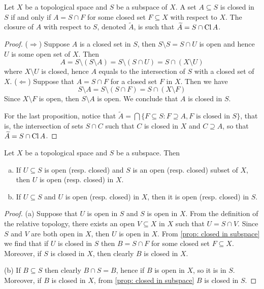 \begin{proposition}\label{prop: closed in subspace}
Let \(X\) be a topological space and \(S\) be a subspace of \(X\). A set
\(A \subseteq S\) is closed in \(S\) if and only if \(A = S \cap F\) for some
closed set \(F \subseteq X\) with respect to \(X\). The closure of \(A\) with
respect to \(S\), denoted \(\widetilde A\), is such that
\(\widetilde A = S \cap \operatorname{Cl} A\).
\end{proposition}

\begin{proof}
(\(\Rightarrow\)) Suppose \(A\) is a closed set in \(S\), then \(S \setminus
S = S \cap U\) is open and hence \(U\) is some open set of \(X\). Then
\[
  A = S \setminus (S \setminus A) = S \setminus (S \cap U)
  = S \cap (X \setminus U)
\]
where \(X \setminus U\) is closed, hence \(A\) equals to the intersection of
\(S\) with a closed set of \(X\).
(\(\Leftarrow\)) Suppose that \(A = S \cap F\) for a closed set \(F\) in
\(X\). Then we have
\[
  S \setminus A = S \setminus (S \cap F) = S \cap (X \setminus F)
\]
Since \(X\setminus F\) is open, then \(S \setminus A\) is open. We conclude
that \(A\) is closed in \(S\).

For the last proposition, notice that \(\widetilde A = \bigcap \{F \subseteq S
\colon F \supseteq A, F \text{ is closed in } S\}\), that is, the intersection of
sets \(S \cap C\) such that \(C\) is closed in \(X\) and \(C \supseteq A\), so
that \(\widetilde A = S \cap \operatorname{Cl} A\).
\end{proof}

\begin{proposition}\label{prop: relative open to open}
Let \(X\) be a topological space and \(S\) be a subspace. Then
\begin{enumerate}[(a)]\setlength\itemsep{0em}
  \item If \(U \subseteq S\) is open (resp. closed) and \(S\) is an open
    (resp. closed) subset of \(X\), then \(U\) is open (resp. closed) in
    \(X\).
  \item If \(U \subseteq S\) and \(U\) is open (resp. closed) in \(X\), then
    it is open (resp. closed) in \(S\).
\end{enumerate}
\end{proposition}

\begin{proof}
(a) Suppose that \(U\) is open in \(S\) and \(S\) is open in \(X\). From the
definition of the relative topology, there exists an open \(V \subseteq X\) in
\(X\) such that \(U = S \cap V\). Since \(S\) and \(V\) are both open in
\(X\), then \(U\) is open in \(X\). From \cref{prop: closed in subspace} we
find that if \(U\) is closed in \(S\) then \(B = S \cap F\) for some closed
set \(F \subseteq X\). Moreover, if \(S\) is closed in \(X\), then clearly
\(B\) is closed in \(X\).

(b) If \(B \subseteq S\) then clearly \(B \cap S = B\), hence if \(B\) is open
in \(X\), so it is in \(S\). Moreover, if \(B\) is closed in \(X\), from
\cref{prop: closed in subspace} \(B\) is closed in \(S\).
\end{proof}

